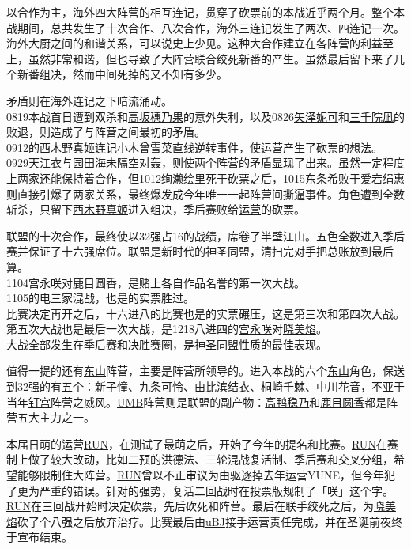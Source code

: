 以合作为主，海外四大阵营的相互连记，贯穿了砍票前的本战近乎两个月。整个本战期间，总共发生了十次合作、八次合作，海外三连记发生了两次、四连记一次。海外大厨之间的和谐关系，可以说史上少见。这种大合作建立在各阵营的利益至上，虽然非常和谐，但也导致了大阵营联合绞死新番的产生。虽然最后留下来了几个新番组决，然而中间死掉的又不知有多少。

矛盾则在海外连记之下暗流涌动。\\
0819本战首日遭到双杀和\uline{高坂穗乃果}的意外失利，以及0826\uline{矢泽妮可}和\uline{三千院凪}的败退，则造成了与阵营之间最初的矛盾。\\
0912的\uline{西木野真姬}连记\uline{小木曾雪菜}直线逆转事件，使运营产生了砍票的想法。\\
0929\uline{天江衣}与\uline{园田海未}隔空对轰，则使两个阵营的矛盾显现了出来。虽然一定程度上两家还能保持着合作，但1012\uline{绚濑绘里}死于砍票之后，1015\uline{东条希}败于\uline{爱宕绢惠}则直接引爆了两家关系，最终爆发成今年唯一一起阵营间撕逼事件。角色遭到全数斩杀，只留下\uline{西木野真姬}进入组决，季后赛败给\uline{运营}的砍票。

联盟的十次合作，最终使以32强占16的战绩，席卷了半壁江山。五色全数进入季后赛并保证了十六强席位。联盟是新时代的神圣同盟，清扫完对手把总账放到最后算。\\
1104宫永咲对鹿目圆香，是赌上各自作品名誉的第一次大战。\\
1105的电三家混战，也是的实票胜过。\\
比赛决定再开之后，十六进八的比赛也是的实票碾压，这是第三次和第四次大战。\\
第五次大战也是最后一次大战，是1218八进四的\uline{宫永咲}对\uline{晓美焰}。\\
大战全部发生在季后赛和决胜赛圈，是神圣同盟性质的最佳表现。

值得一提的还有\uline{东山}阵营，主要是阵营所领导的。进入本战的六个\uline{东山}角色，保送到32强的有五个：\uline{新子憧}、\uline{九条可怜}、\uline{由比滨结衣}、\uline{桐崎千棘}、\uline{中川花音}，不亚于当年\uline{钉宫}阵营之威风。\uline{UMB}阵营则是联盟的副产物：\uline{高鸭稳乃}和\uline{鹿目圆香}都是阵营五大主力之一。

本届日萌的运营\uline{RUN}，在测试了最萌之后，开始了今年的提名和比赛。\uline{RUN}在赛制上做了较大改动，比如二预的洪德法、三轮混战复活制、季后赛和交叉分组，希望能够限制住大阵营。\uline{RUN}曾以不正审议为由驱逐掉去年运营YUNE，但今年犯了更为严重的错误。针对的强势，复活二回战时在投票版规制了「咲」这个字。\uline{RUN}在三回战开始时决定砍票，先后砍死和阵营。最后在联手绞死之后，为\uline{晓美焰}砍了个八强之后放弃治疗。比赛最后由\uline{uBJ}接手运营责任完成，并在圣诞前夜终于宣布结束。

